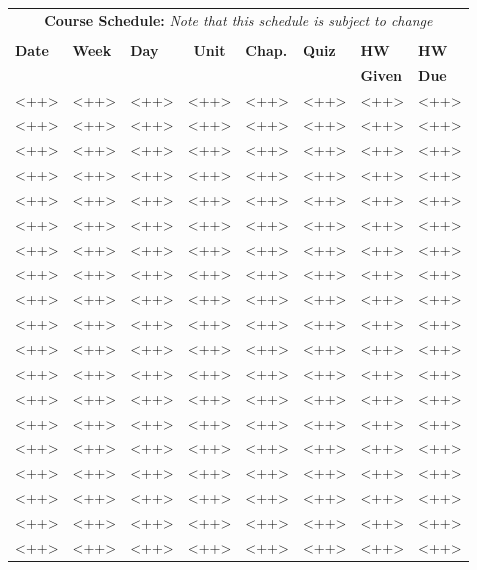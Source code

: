 \documentclass[11pt, a4paper]{article}
\begin{document}
\pagebreak
\FloatBarrier
\renewcommand{\arraystretch}{1}
\begin{table}[h]
\begin{center}
\begin{tabular}{lllcllll}
\multicolumn{8}{c}{\textbf{Course Schedule:}\textit{ Note that this schedule is subject to change}}\\
&&&&&&&\\
\textbf{Date} & \textbf{Week} & \textbf{Day} & \textbf{Unit} & \textbf{Chap.} & \textbf{Quiz} & \textbf{HW} & \textbf{HW}\\
 &  &  &  &  &                                                                                          & \textbf{Given} & \textbf{Due}\\
\hline
\hline
<++> & <++> & <++> & <++> & <++> & <++> & <++> & <++>\\
<++> & <++> & <++> & <++> & <++> & <++> & <++> & <++>\\
<++> & <++> & <++> & <++> & <++> & <++> & <++> & <++>\\
<++> & <++> & <++> & <++> & <++> & <++> & <++> & <++>\\
<++> & <++> & <++> & <++> & <++> & <++> & <++> & <++>\\
<++> & <++> & <++> & <++> & <++> & <++> & <++> & <++>\\
<++> & <++> & <++> & <++> & <++> & <++> & <++> & <++>\\
<++> & <++> & <++> & <++> & <++> & <++> & <++> & <++>\\
<++> & <++> & <++> & <++> & <++> & <++> & <++> & <++>\\
<++> & <++> & <++> & <++> & <++> & <++> & <++> & <++>\\
<++> & <++> & <++> & <++> & <++> & <++> & <++> & <++>\\
<++> & <++> & <++> & <++> & <++> & <++> & <++> & <++>\\
<++> & <++> & <++> & <++> & <++> & <++> & <++> & <++>\\
<++> & <++> & <++> & <++> & <++> & <++> & <++> & <++>\\
<++> & <++> & <++> & <++> & <++> & <++> & <++> & <++>\\
<++> & <++> & <++> & <++> & <++> & <++> & <++> & <++>\\
<++> & <++> & <++> & <++> & <++> & <++> & <++> & <++>\\
<++> & <++> & <++> & <++> & <++> & <++> & <++> & <++>\\
<++> & <++> & <++> & <++> & <++> & <++> & <++> & <++>\\

\end{tabular}
\end{center}
\end{table}
\end{document}
